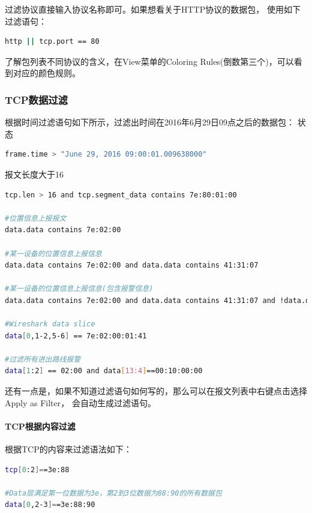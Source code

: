 \documentclass{book}
\begin{document}
过滤协议直接输入协议名称即可。如果想看关于HTTP协议的数据包，
使用如下过滤语句：

\begin{lstlisting}[language=Bash]
http || tcp.port == 80
\end{lstlisting}

了解包列表不同协议的含义，在View菜单的Coloring Rules(倒数第三个)，可以看到对应的颜色规则。

\subsubsection{TCP数据过滤}

根据时间过滤语句如下所示，过滤出时间在2016年6月29日09点之后的数据包：
状态
\begin{lstlisting}[language=Bash]
frame.time > "June 29, 2016 09:00:01.009638000"
\end{lstlisting}

报文长度大于16

\begin{lstlisting}[language=Bash]
tcp.len > 16 and tcp.segment_data contains 7e:80:01:00

#位置信息上报报文
data.data contains 7e:02:00

#某一设备的位置信息上报信息
data.data contains 7e:02:00 and data.data contains 41:31:07

#某一设备的位置信息上报信息(包含报警信息)
data.data contains 7e:02:00 and data.data contains 41:31:07 and !data.data[53,4] == 00:00:00:00

#Wireshark data slice
data[0,1-2,5-6] == 7e:02:00:01:41

#过滤所有进出路线报警
data[1:2] == 02:00 and data[13:4]==00:10:00:00
\end{lstlisting}

还有一点是，如果不知道过滤语句如何写的，那么可以在报文列表中右键点击选择Apply as Filter，
会自动生成过滤语句。

\paragraph{TCP根据内容过滤}

根据TCP的内容来过滤语法如下：

\begin{lstlisting}[language=Bash]
tcp[0:2]==3e:88

#Data层满足第一位数据为3e，第2到3位数据为88:90的所有数据包
data[0,2-3]==3e:88:90
\end{lstlisting}
\end{document}

